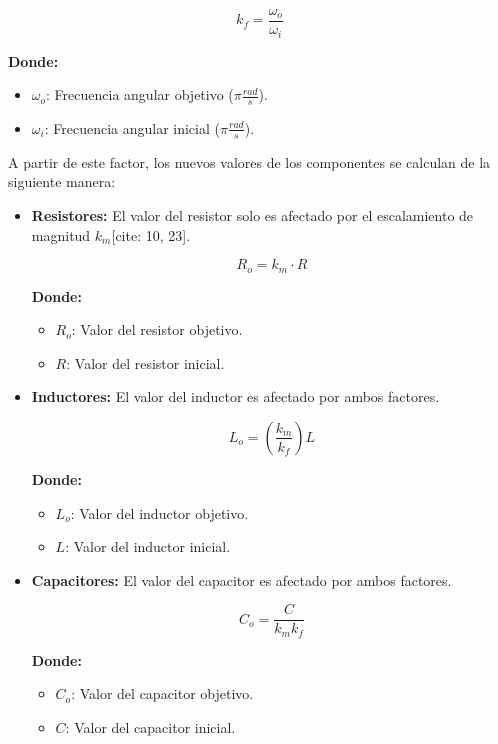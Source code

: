 \documentclass[12pt, letterpaper]{article}
\begin{document}
\[k_f = \frac{\omega_o}{\omega_i} \]

\textbf{Donde:}
\begin{itemize}
    \item \(\omega_o\): Frecuencia angular objetivo (\(\pi \frac{rad}{s}\)).
    \item \(\omega_i\): Frecuencia angular inicial (\(\pi \frac{rad}{s}\)).
\end{itemize}

A partir de este factor, los nuevos valores de los componentes se calculan de la siguiente manera:

\begin{itemize}
    \item \textbf{Resistores:} El valor del resistor solo es afectado por el escalamiento de magnitud \(k_m\)[cite: 10, 23].

    \[ R_o = k_m \cdot R \]

    \textbf{Donde:}
    \begin{itemize}
        \item \(R_o\): Valor del resistor objetivo.
        \item \(R\): Valor del resistor inicial.
    \end{itemize}

    \item \textbf{Inductores:} El valor del inductor es afectado por ambos factores.

    \[ L_o = \left( \frac{k_m}{k_f} \right) L \]

    \textbf{Donde:}
    \begin{itemize}
        \item \(L_o\): Valor del inductor objetivo.
        \item \(L\): Valor del inductor inicial.
    \end{itemize}

    \item \textbf{Capacitores:} El valor del capacitor es afectado por ambos factores.

    \[ C_o = \frac{C}{k_m k_f} \]

    \textbf{Donde:}
    \begin{itemize}
        \item \(C_o\): Valor del capacitor objetivo.
        \item \(C\): Valor del capacitor inicial.
    \end{itemize}
\end{itemize}
\end{document}
